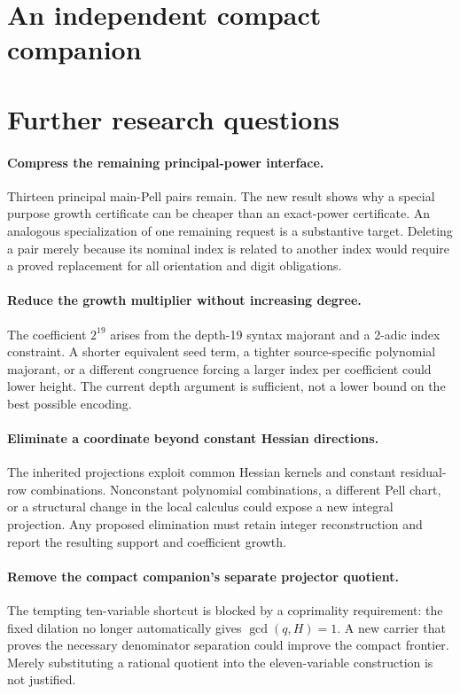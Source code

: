 \documentclass[11pt,a4paper]{article}
\theoremstyle{remark}\newtheorem{remark}[theorem]{Remark}
\begin{document}
\section{An independent compact companion}\label{sec:compact}



\section{Further research questions}\label{sec:further}

\paragraph{Compress the remaining principal-power interface.}
Thirteen principal main-Pell pairs remain. The new result shows why a special
purpose growth certificate can be cheaper than an exact-power certificate.
An analogous specialization of one remaining request is a substantive target.
Deleting a pair merely because its nominal index is related to another index
would require a proved replacement for all orientation and digit obligations.

\paragraph{Reduce the growth multiplier without increasing degree.}
The coefficient $2^{19}$ arises from the depth-19 syntax majorant and a
2-adic index constraint. A shorter equivalent seed term, a tighter
source-specific polynomial majorant, or a different congruence forcing a
larger index per coefficient could lower height. The current depth argument
is sufficient, not a lower bound on the best possible encoding.

\paragraph{Eliminate a coordinate beyond constant Hessian directions.}
The inherited projections exploit common Hessian kernels and constant
residual-row combinations. Nonconstant polynomial combinations, a different
Pell chart, or a structural change in the local calculus could expose a new
integral projection. Any proposed elimination must retain integer
reconstruction and report the resulting support and coefficient growth.

\paragraph{Remove the compact companion's separate projector quotient.}
The tempting ten-variable shortcut is blocked by a coprimality requirement:
the fixed dilation no longer automatically gives $\gcd(q,H)=1$.
A new carrier that proves the necessary denominator separation could improve
the compact frontier. Merely substituting a rational quotient into the
eleven-variable construction is not justified.
\end{document}
